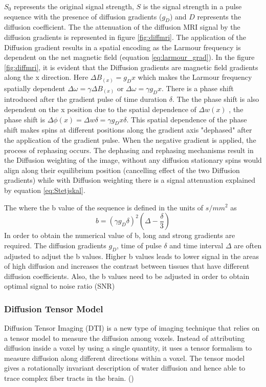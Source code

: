 \documentclass[msthesis.tex]{subfiles}
\begin{document}
$S_0$ represents the original signal strength,  $S$ is the signal strength in a pulse sequence with the presence of diffusion gradients ($g_D$) and $D$ represents the diffusion coefficient. The the attenuation of the diffusion MRI signal by the diffusion gradients is represented in figure \ref{fig:diffmri}. The application of the Diffusion gradient results in a spatial encoding as the Larmour frequency is dependent on the net magnetic field (equation \ref{eq:larmour_grad}). In the figure \ref{fig:diffmri}, it is evident that the Diffusion gradients are magnetic field gradients along the x direction. 
Here $\Delta B_(x) = g_D x$ which makes the Larmour frequency spatially dependent $\Delta \omega = \gamma \Delta B_(x)$ or $\Delta \omega = \gamma g_D x$. There is a phase shift introduced after the gradient pulse of time duration $\delta$. The the phase shift is also dependent on the x position due to the spatial dependence of $\Delta w(x)$  ,  the phase shift is $\Delta \phi (x) = \Delta w \delta = \gamma g_D x \delta$. This spatial dependence of the phase shift makes spins at different positions along the gradient axis "dephased" after the application of the gradient pulse. When the negative gradient is applied, the process of rephasing occurs. The dephasing and rephasing mechanisms result in the Diffusion weighting of the image, without any diffusion stationary spins would align along their equilibrium position (cancelling effect of the two Diffusion gradients) while with Diffusion weighting there is a signal attenuation explained by equation \ref{eq:Stetjskal}. 

The where the b value of the sequence is defined in the units of $s/mm^2$ as
\begin{equation}
    b = (\gamma g_D \delta)^2 (\Delta - \frac{\delta}{3})
\end{equation}
In order to obtain the numerical value of b, long and strong gradients are required. The diffusion gradients $g_D$, time of pulse $\delta$ and time interval $\Delta$ are often adjusted to adjust the b values. Higher b values leads to lower signal in the areas of high diffusion and increases the contrast between tissues that have different diffusion coefficients. Also, the b values need to be adjusted in order to obtain optimal signal to noise ratio (SNR)


\subsubsection{Diffusion Tensor Model}
Diffusion Tensor Imaging (DTI) is a new type of imaging technique that relies on a tensor model to measure the diffusion among voxels. Instead of attributing diffusion inside a voxel by using a single quantity, it uses a tensor formalism to measure diffusion along different directions within a voxel. The tensor model gives a rotationally invariant description of water diffusion and hence able to trace complex fiber tracts in the brain. (\cite{jones2010diffusion})
\end{document}
